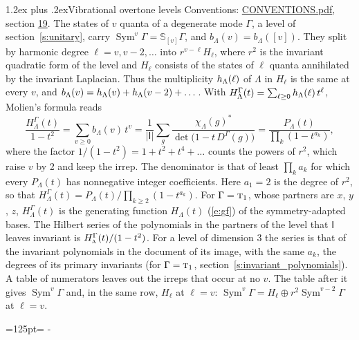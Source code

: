 \documentclass[10pt,a4paper]{article}
\makeatletter
\renewcommand\section{\@startsection{section}{1}{\z@}{-3ex plus -1ex minus -.2ex}%
  {1.2ex plus .2ex}{\normalfont\large\sffamily\bfseries\color{parttitle}}}
\newcommand{\needspace}[1]{\par\penalty-100\begingroup\dimen0=#1\relax\dimen2=\pagegoal
  \advance\dimen2-\pagetotal\ifdim\dimen0>\dimen2\relax\ifdim\dimen2>0pt\vfil\break\fi\fi
  \endgroup}
\numberwithin{equation}{section}
\newcommand{\grp}[1]{\mathsf{#1}}
\newcommand{\irr}[1]{\text{\normalfont\scshape #1}}
\newcommand{\repD}[1]{D^{#1}}
\newcommand{\irchar}[1]{\chi_{#1}}
\newcommand{\conj}[1]{{#1}^{*}}
\newcommand{\schur}[1]{\mathbb{S}_{#1}}
\newcommand{\shape}[1]{[#1]}
\makeatother
\begin{document}
\section{Vibrational overtone levels}\label{s:overtones}
Conventions: \href{../../CONVENTIONS.pdf}{CONVENTIONS.pdf}, section \href{../../CONVENTIONS.pdf\#conv.19}{19}.
\leavevmode\label{n:index.quanta}\label{n:operator.symmetric.power}The states of $v$ quanta of a degenerate mode $\Gamma$, a level of section~\ref{s:unitary}, carry $\operatorname{Sym}^{v}\Gamma = \schur{\shape{v}}\Gamma$, and $b_\Lambda(v) = b_\Lambda(\shape{v})$. \label{n:local.quadratic.form}\label{n:set.harmonic}They split by harmonic degree $\ell = v, v - 2, \dots$ into $r^{v-\ell}H_\ell$, where $r^2$ is the invariant quadratic form of the level and $H_\ell$ consists of the states of $\ell$ quanta annihilated by the invariant Laplacian. \label{n:function.multiplicity.harmonic}Thus the multiplicity $\mathnormal{h}_\Lambda(\ell)$ of $\Lambda$ in $H_\ell$ is the same at every $v$, and $b_\Lambda(v) = \mathnormal{h}_\Lambda(v) + \mathnormal{h}_\Lambda(v - 2) + \dots$. \label{n:function.generating.level}With $H^{\Gamma}_\Lambda(t) = \sum_{\ell\ge0} \mathnormal{h}_\Lambda(\ell)\,t^{\ell}$, Molien's formula reads
\begin{equation}\label{e:molien}\frac{H^{\Gamma}_\Lambda(t)}{1 - t^2} = \sum_{v\ge0} b_\Lambda(v)\,t^v = \frac{1}{|\grp{I}|}\sum_{g}\frac{\conj{\irchar{\Lambda}(g)}}{\det\bigl(1 - t\,\repD{\Gamma}(g)\bigr)} = \frac{P_\Lambda(t)}{\prod_k (1-t^{a_k})},\end{equation}
where the factor $1/(1 - t^2) = 1 + t^2 + t^4 + \dots$ counts the powers of $r^2$, which raise $v$ by 2 and keep the irrep. The denominator is that of least $\prod_k a_k$ for which every $P_\Lambda(t)$ has nonnegative integer coefficients. Here $a_1 = 2$ is the degree of $r^2$, so that $H^{\Gamma}_\Lambda(t) = P_\Lambda(t)/\prod_{k\ge2}(1 - t^{a_k})$. For $\Gamma = \irr{t}_{1}$, whose partners are $x$, $y$, $z$, $H^{\Gamma}_\Lambda(t)$ is the generating function $H_\Lambda(t)$ (\ref{e:gf}) of the symmetry-adapted bases. The Hilbert series of the polynomials in the partners of the level that $\grp{I}$ leaves invariant is $H^{\Gamma}_{\irr{a}}(t)/(1 - t^2)$. For a level of dimension 3 the series is that of the invariant polynomials in the document of its image, with the same $a_k$, the degrees of its primary invariants (for $\Gamma = \irr{t}_{1}$, section~\ref{s:invariant_polynomials}). A table of numerators leaves out the irreps that occur at no $v$. The table after it gives $\operatorname{Sym}^{v}\Gamma$ and, in the same row, $H_\ell$ at $\ell = v$: $\operatorname{Sym}^{v}\Gamma = H_\ell \oplus r^2\operatorname{Sym}^{v-2}\Gamma$ at $\ell = v$.
\needspace{125pt}
\end{document}
